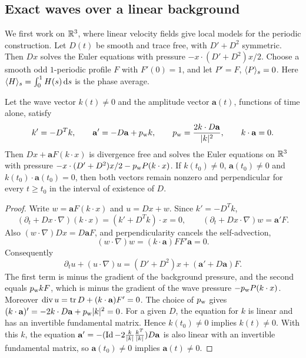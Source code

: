 \subsection{Exact waves over a linear background}\label{cc:sec:affine}
We first work on $\mathbb R^3$, where linear velocity fields give local models for the
periodic construction. Let $D(t)$ be smooth and trace free, with
$D'+D^2$ symmetric. Then $Dx$ solves the Euler equations with pressure
$-x\cdot(D'+D^2)x/2$. Choose a smooth odd $1$-periodic profile
$F$ with $F'(0)=1$, and let $P'=F$, $\langle P\rangle_s=0$.
Here $\langle H\rangle_s=\int_0^1H(s)\,\mathrm ds$ is the phase average.

\begin{lemma}\label{cc:lem:wave}
Let the wave vector $k(t)\ne0$ and the amplitude vector $\mathbf a(t)$,
functions of time alone, satisfy
\begin{equation}\label{cc:eq:wave-ode}
 k'=-D^Tk,\qquad
 \mathbf a'=-D\mathbf a+p_{\rm w} k,\qquad
 p_{\rm w}=\frac{2k\cdot D\mathbf a}{|k|^2},\qquad
 k\cdot\mathbf a=0.
\end{equation}
Then $Dx+\mathbf aF(k\cdot x)$ is divergence free and solves the Euler equations on $\mathbb R^3$ with
pressure $-x\cdot(D'+D^2)x/2-p_{\rm w} P(k\cdot x)$.
If $k(t_0)\ne0$, $\mathbf a(t_0)\ne0$ and
$k(t_0)\cdot\mathbf a(t_0)=0$, then both vectors remain nonzero and
perpendicular for every $t\ge t_0$ in the interval of existence of $D$.
\end{lemma}
\begin{proof}
Write $w=\mathbf aF(k\cdot x)$ and $u=Dx+w$. Since $k'=-D^Tk$,
\[
 (\partial_t+Dx\cdot\nabla)(k\cdot x)=(k'+D^Tk)\cdot x=0,
 \qquad (\partial_t+Dx\cdot\nabla)w=\mathbf a'F.
\]
Also $(w\cdot\nabla)Dx=D\mathbf aF$, and perpendicularity cancels
the self-advection,
\[
 (w\cdot\nabla)w=(k\cdot\mathbf a)FF'\mathbf a=0.
\]
Consequently
\[
 \partial_tu+(u\cdot\nabla)u=(D'+D^2)x+(\mathbf a'+D\mathbf a)F.
\]
The first term is minus the gradient of the background pressure, and
the second equals $p_{\rm w}kF$, which is minus the gradient of the
wave pressure $-p_{\rm w}P(k\cdot x)$. Moreover
$\operatorname{div} u=\operatorname{tr} D+(k\cdot\mathbf a)F'=0$.
The choice of $p_{\rm w}$ gives
$(k\cdot\mathbf a)'=-2k\cdot D\mathbf a+p_{\rm w}|k|^2=0$.
For a given $D$, the equation for $k$ is linear and has an invertible
fundamental matrix. Hence $k(t_0)\ne0$ implies $k(t)\ne0$. With this
$k$, the equation
$\mathbf a'=-(\operatorname{Id}-2\frac{k}{|k|}\frac{k^T}{|k|})D\mathbf a$
is also linear with an invertible fundamental matrix, so
$\mathbf a(t_0)\ne0$ implies $\mathbf a(t)\ne0$.
\end{proof}

